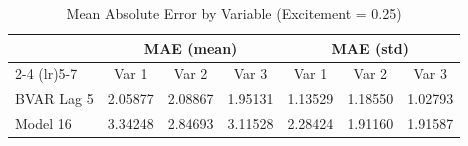 \begin{table}[htbp]
\centering
\caption{Mean Absolute Error by Variable (Excitement = 0.25)}
\label{tab:mae_0p25}
\begin{tabular}{lcccccc}
\toprule
 & \multicolumn{3}{c}{MAE (mean)} & \multicolumn{3}{c}{MAE (std)} \\
\cmidrule(lr){2-4} \cmidrule(lr){5-7}
 & Var 1 & Var 2 & Var 3 & Var 1 & Var 2 & Var 3 \\
\midrule
BVAR Lag 5 & 2.05877 & 2.08867 & 1.95131 & 1.13529 & 1.18550 & 1.02793 \\
Model 16 & 3.34248 & 2.84693 & 3.11528 & 2.28424 & 1.91160 & 1.91587 \\
\bottomrule
\end{tabular}
\end{table}

